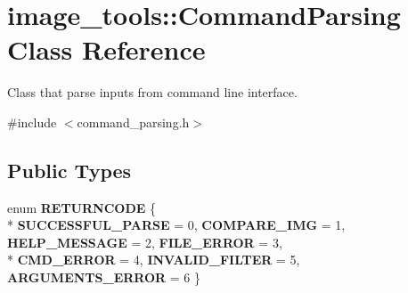 \hypertarget{classimage__tools_1_1CommandParsing}{}\section{image\+\_\+tools\+:\+:Command\+Parsing Class Reference}
\label{classimage__tools_1_1CommandParsing}


Class that parse inputs from command line interface.  




{\ttfamily \#include $<$command\+\_\+parsing.\+h$>$}

\subsection*{Public Types}
\begin{DoxyCompactItemize}
\item 
enum {\bfseries R\+E\+T\+U\+R\+N\+C\+O\+DE} \{ \\*
{\bfseries S\+U\+C\+C\+E\+S\+S\+F\+U\+L\+\_\+\+P\+A\+R\+SE} = 0, 
{\bfseries C\+O\+M\+P\+A\+R\+E\+\_\+\+I\+MG} = 1, 
{\bfseries H\+E\+L\+P\+\_\+\+M\+E\+S\+S\+A\+GE} = 2, 
{\bfseries F\+I\+L\+E\+\_\+\+E\+R\+R\+OR} = 3, 
\\*
{\bfseries C\+M\+D\+\_\+\+E\+R\+R\+OR} = 4, 
{\bfseries I\+N\+V\+A\+L\+I\+D\+\_\+\+F\+I\+L\+T\+ER} = 5, 
{\bfseries A\+R\+G\+U\+M\+E\+N\+T\+S\+\_\+\+E\+R\+R\+OR} = 6
 \}\hypertarget{classimage__tools_1_1CommandParsing_a12efd632efec19824931dc1c7ae1215d}{}\label{classimage__tools_1_1CommandParsing_a12efd632efec19824931dc1c7ae1215d}

\end{DoxyCompactItemize}
